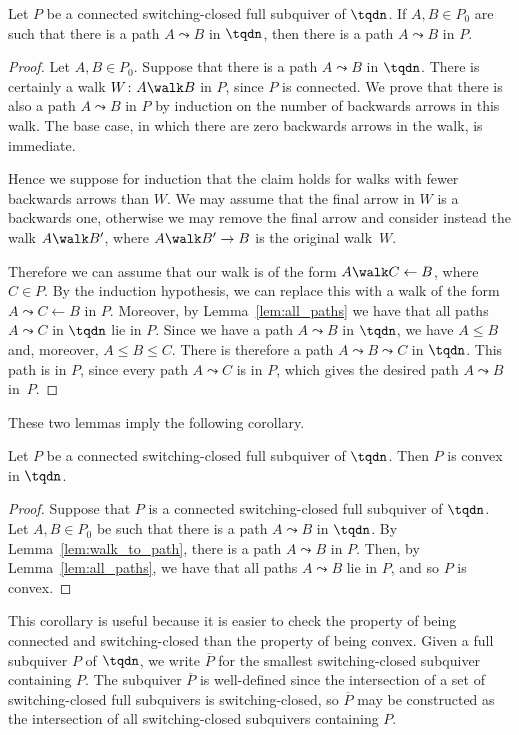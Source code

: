 \begin{lemma}\label{lem:walk_to_path}
Let $P$ be a connected switching-closed full subquiver of $\tqdn$. If $A,B \in P_{0}$ are such that there is a path $A \leadsto B$ in $\tqdn$, then there is a path $A \leadsto B$ in $P$.
\end{lemma}
\begin{proof}
Let $A,B \in P_{0}$. Suppose that there is a path $A \leadsto B$ in $\tqdn$. There is certainly a walk $W \colon A \walk B$ in $P$, since $P$ is connected. We prove that there is also a path $A \leadsto B$ in $P$ by induction on the number of backwards arrows in this walk. The base case, in which there are zero backwards arrows in the walk, is immediate.

Hence we suppose for induction that the claim holds for walks with fewer backwards arrows than $W$. We may assume that the final arrow in $W$ is a backwards one, otherwise we may remove the final arrow and consider instead the walk $A \walk B'$, where $A \walk B' \rightarrow B$ is the original walk~$W$.

Therefore we can assume that our walk is of the form $A \walk C \leftarrow B$, where $C \in P$. By the induction hypothesis, we can replace this with a walk of the form $A \leadsto C \leftarrow B$ in $P$. Moreover, by Lemma~\ref{lem:all_paths} we have that all paths $A \leadsto C$ in $\tqdn$ lie in $P$. Since we have a path $A \leadsto B$ in $\tqdn$, we have $A \leqslant B$ and, moreover, $A \leqslant B \leqslant C$. There is therefore a path $A \leadsto B \leadsto C$ in $\tqdn$. This path is in $P$, since every path $A \leadsto C$ is in $P$, which gives the desired path $A \leadsto B$ in~$P$.
\end{proof}

These two lemmas imply the following corollary.

\begin{coro}\label{cor:switch+con->conv}
Let $P$ be a connected switching-closed full subquiver of $\tqdn$. Then $P$ is convex in $\tqdn$.
\end{coro}
\begin{proof}
Suppose that $P$ is a connected switching-closed full subquiver of $\tqdn$. Let $A, B \in P_{0}$ be such that there is a path $A \leadsto B$ in $\tqdn$. By Lemma~\ref{lem:walk_to_path}, there is a path $A \leadsto B$ in $P$. Then, by Lemma~\ref{lem:all_paths}, we have that all paths $A \leadsto B$ lie in $P$, and so $P$ is convex.
\end{proof}

This corollary is useful because it is easier to check the property of being connected and switching-closed than the property of being convex. Given a full subquiver $P$ of $\tqdn$, we write $\overline{P}$ for the smallest switching-closed subquiver containing $P$. The subquiver $\overline{P}$ is well-defined since the intersection of a set of switching-closed full subquivers is switching-closed, so $\overline{P}$ may be constructed as the intersection of all switching-closed subquivers containing $P$.
